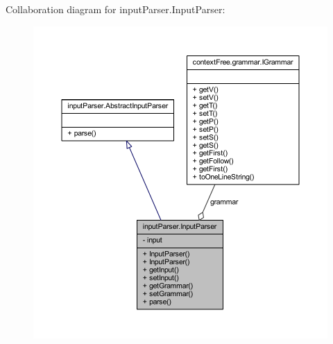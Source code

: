 Collaboration diagram for input\-Parser.\-Input\-Parser\-:\nopagebreak
\begin{figure}[H]
\begin{center}
\leavevmode
\includegraphics[width=350pt]{classinput_parser_1_1_input_parser__coll__graph}
\end{center}
\end{figure}
